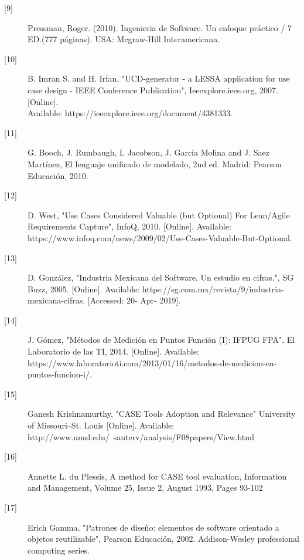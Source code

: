 \begin{description}
		\item[\hypertarget{b09}{[9]}] Pressman, Roger. (2010). Ingenieria de Software. Un enfoque práctico / 7 ED.(777 páginas). USA: Mcgraw-Hill Interamericana.
		
		\item[\hypertarget{b10}{[10]}] B. Imran S. and H. Irfan, "UCD-generator - a LESSA application for use case design - IEEE Conference Publication", Ieeexplore.ieee.org, 2007. [Online]. \\Available: https://ieeexplore.ieee.org/document/4381333.
		
		\item[\hypertarget{b11}{[11]}] G. Booch, J. Rumbaugh, I. Jacobson, J. García Molina and J. Saez Martínez, El lenguaje unificado de modelado, 2nd ed. Madrid: Pearson Educación, 2010.
		
		\item[\hypertarget{b12}{[12]}] D. West, "Use Cases Considered Valuable (but Optional) For Lean/Agile Requirements Capture", InfoQ, 2010. [Online]. Available: https://www.infoq.com/news/2009/02/Use-Cases-Valuable-But-Optional. 
		
		\item[\hypertarget{b13}{[13]}] D. González, "Industria Mexicana del Software. Un estudio en cifras.", SG Buzz, 2005. [Online]. Available: https://sg.com.mx/revista/9/industria-mexicana-cifras. [Accessed: 20- Apr- 2019].
		
		\item[\hypertarget{b14}{[14]}] J. Gómez, "Métodos de Medición en Puntos Función (I): IFPUG FPA", El Laboratorio de las TI, 2014. [Online]. Available: https://www.laboratorioti.com/2013/01/16/metodos-de-medicion-en-puntos-funcion-i/. 
		
		\item[\hypertarget{b15}{[15]}] Ganesh Krishnamurthy, "CASE Tools 
		Adoption and Relevance" University of Missouri–St. Louis [Online]. Available: http://www.umsl.edu/~sauterv/analysis/F08papers/View.html
		
		\item[\hypertarget{b16}{[16]}] Annette L. du Plessis, A method for CASE tool evaluation, Information and Management, Volume 25, Issue 2, August 1993, Pages 93-102
		
		\item[\hypertarget{b17}{[17]}]	Erich Gamma, "Patrones de diseño: elementos de software orientado a objetos reutilizable", Pearson Educación, 2002. Addison-Wesley professional computing series.
		

\end{description}
